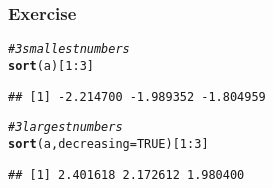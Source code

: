 \documentclass[12pt]{beamer}\usepackage[]{graphicx}\usepackage[]{color}
\makeatletter
\newcommand{\hlnum}[1]{\textcolor[rgb]{0.686,0.059,0.569}{#1}}%
\newcommand{\hlcom}[1]{\textcolor[rgb]{0.678,0.584,0.686}{\textit{#1}}}%
\newcommand{\hlopt}[1]{\textcolor[rgb]{0,0,0}{#1}}%
\newcommand{\hlstd}[1]{\textcolor[rgb]{0.345,0.345,0.345}{#1}}%
\newcommand{\hlkwc}[1]{\textcolor[rgb]{0.333,0.667,0.333}{#1}}%
\newcommand{\hlkwd}[1]{\textcolor[rgb]{0.737,0.353,0.396}{\textbf{#1}}}%
\newenvironment{kframe}{%
 \def\at@end@of@kframe{}%
 \ifinner\ifhmode%
  \def\at@end@of@kframe{\end{minipage}}%
  \begin{minipage}{\columnwidth}%
 \fi\fi%
 \def\FrameCommand##1{\hskip\@totalleftmargin \hskip-\fboxsep
 \colorbox{shadecolor}{##1}\hskip-\fboxsep
     \hskip-\linewidth \hskip-\@totalleftmargin \hskip\columnwidth}%
 \MakeFramed {\advance\hsize-\width
   \@totalleftmargin\z@ \linewidth\hsize
   \@setminipage}}%
 {\par\unskip\endMakeFramed%
 \at@end@of@kframe}
\newenvironment{knitrout}{}{} %
\makeatother
\begin{document}

\begin{frame}[fragile]
\frametitle{Exercise}

\begin{knitrout}\footnotesize
{}\color{fgcolor}\begin{kframe}
\begin{alltt}
\hlcom{# 3 smallest numbers}
\hlkwd{sort}\hlstd{(a)[}\hlnum{1}\hlopt{:}\hlnum{3}\hlstd{]}
\end{alltt}
\begin{verbatim}
## [1] -2.214700 -1.989352 -1.804959
\end{verbatim}
\begin{alltt}
\hlcom{# 3 largest numbers}
\hlkwd{sort}\hlstd{(a,} \hlkwc{decreasing} \hlstd{=} \hlnum{TRUE}\hlstd{)[}\hlnum{1}\hlopt{:}\hlnum{3}\hlstd{]}
\end{alltt}
\begin{verbatim}
## [1] 2.401618 2.172612 1.980400
\end{verbatim}
\end{kframe}
\end{knitrout}

\end{frame}

\end{document}
